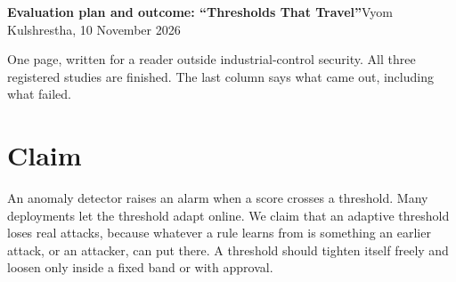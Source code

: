 \documentclass[9pt,a4paper]{extarticle}
\begin{document}
{\large\bfseries Evaluation plan and outcome: ``Thresholds That Travel''}\hfill Vyom Kulshrestha, 10 November 2026

\smallskip
One page, written for a reader outside industrial-control security. All three registered studies are
finished. The last column says what came out, including what failed.

\section{Claim}
An anomaly detector raises an alarm when a score crosses a threshold. Many deployments let the threshold
adapt online. We claim that an adaptive threshold loses real attacks, because whatever a rule learns from
is something an earlier attack, or an attacker, can put there. A threshold should tighten itself freely
and loosen only inside a fixed band or with approval.
\end{document}
